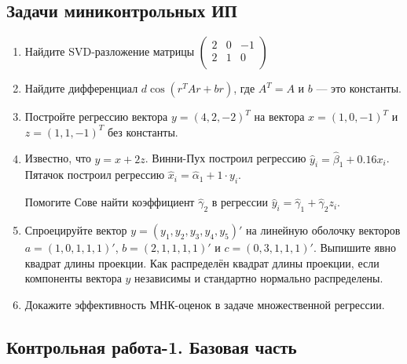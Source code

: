 \subsection{Задачи миниконтрольных ИП}

\begin{enumerate}
  \item Найдите SVD-разложение матрицы $
  \begin{pmatrix}
  2 & 0 & -1 \\
  2 & 1 & 0 \\
  \end{pmatrix}$
 \item Найдите дифференциал $d \cos(r^TAr+br)$, где $A^T=A$ и $b$ — это константы.
 \item Постройте регрессию вектора $y = (4,2,-2)^T$ на вектора $x=(1,0,-1)^T$ и $z=(1,1,-1)^T$
 без константы.
 \item Известно, что $y=x + 2z$. Винни-Пух построил регрессию $\hat y_i = \hat\beta_1 + 0.16 x_i$.
 Пятачок построил регрессию $\hat x_i = \hat \alpha_1 + 1\cdot y_i$.

 Помогите Сове найти коэффициент $\hat \gamma_2$ в регрессии $\hat y_i = \hat\gamma_1 + \hat\gamma_2 z_i$.

 \item Спроецируйте вектор $y=(y_1, y_2, y_3, y_4, y_5)'$ на линейную оболочку векторов
 $a=(1, 0, 1,1, 1)'$, $b=(2,1,1,1,1)'$ и $c=(0,3,1,1,1)'$. Выпишите явно квадрат длины
 проекции. Как распределён квадрат длины проекции, если компоненты вектора $y$
 независимы и стандартно нормально распределены.

 \item Докажите эффективность МНК-оценок в задаче множественной регрессии.


\end{enumerate}


\subsection{Контрольная работа-1. Базовая часть}

%
%
%
%
%
%
%
%
%
%


